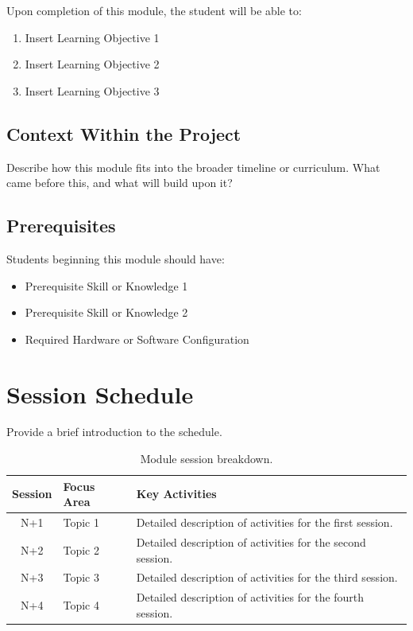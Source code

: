 \documentclass[11pt,letterpaper]{article}
\begin{document}
	\begin{tcolorbox}[objective={Module Learning Objectives}]
		Upon completion of this module, the student will be able to:
		\begin{enumerate}[label=\textbf{LO-\arabic*}]
			\item Insert Learning Objective 1
			\item Insert Learning Objective 2
			\item Insert Learning Objective 3
		\end{enumerate}
	\end{tcolorbox}
	
	\subsection{Context Within the Project}
	
	Describe how this module fits into the broader timeline or curriculum. What came before this, and what will build upon it?
	
	\subsection{Prerequisites}
	
	Students beginning this module should have:
	\begin{itemize}[leftmargin=2em]
		\item Prerequisite Skill or Knowledge 1
		\item Prerequisite Skill or Knowledge 2
		\item Required Hardware or Software Configuration
	\end{itemize}
	
	\newpage
	\section{Session Schedule}

	Provide a brief introduction to the schedule.

	\begin{table}[ht!]
		\centering
		\caption{Module session breakdown.}
		\label{tab:schedule}
		\renewcommand{\arraystretch}{1.4}
		\begin{tabularx}{\textwidth}{c l X}
			\toprule
			\textbf{Session} & \textbf{Focus Area} & \textbf{Key Activities} \\
			\midrule
			N+1 & Topic 1 & Detailed description of activities for the first session. \\
			N+2 & Topic 2 & Detailed description of activities for the second session. \\
			N+3 & Topic 3 & Detailed description of activities for the third session. \\
			N+4 & Topic 4 & Detailed description of activities for the fourth session. \\
			\bottomrule
		\end{tabularx}
	\end{table}
\end{document}
